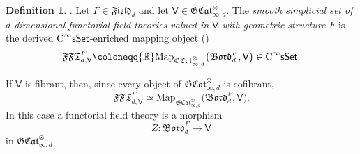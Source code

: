 \documentclass{amsart}
\newcommand{\cat}[1]{\mathsf{#1}}
\newcommand{\sset}{\cat{sSet}}
\newcommand{\CsSet}{\textnormal{C}^{\infty}\sset}
\newcommand{\field}[1]{\mathfrak{Field}_{#1}}
\newcommand{\Bord}{\mathfrak{Bord}}
\newcommand{\FFT}{\mathfrak{FFT}}
\newcommand{\GCat}{\mathfrak{G}\mathfrak{Cat}}
\newcommand{\Map}{\mathrm{Map}}
\newcommand{\RR}{{\mathbb{R}}}
\theoremstyle{definition}
\newtheorem{definition}[equation]{Definition}
\numberwithin{equation}{subsection}
\numberwithin{subsubsection}{subsection}
\begin{document}
\begin{definition}\label{def:functorial.field.theory}
  \textnormal{\cite[Definition~5.3.18]{GP26}.}
  Let \(F\in\field{d}\) and let
  \(\cat{V}\in\GCat_{\infty,d}^{\otimes}\).
  The \emph{smooth simplicial set of \(d\)-dimensional functorial
    field theories valued in \(\cat{V}\) with geometric structure
  \(F\)} is the derived \(\CsSet\)-enriched mapping object
  ()
  \begin{equation}\label{eq:fft.object}
    \FFT_{d,\cat{V}}^{F}
    \coloneqq
    \RR\Map_{\GCat_{\infty,d}^{\otimes}}
    \bigl(\Bord_{d}^{F},\cat{V}\bigr)
    \in\CsSet.
  \end{equation}

  If \(\cat{V}\) is fibrant, then, since every object of
  \(\GCat_{\infty,d}^{\otimes}\) is cofibrant,
  \[
    \FFT_{d,\cat{V}}^{F}
    \simeq
    \Map_{\GCat_{\infty,d}^{\otimes}}
    \bigl(\Bord_{d}^{F},\cat{V}\bigr).
  \]
  In this case a functorial field theory is a morphism
  \[
    Z:\Bord_{d}^{F}\longrightarrow\cat{V}
  \]
  in \(\GCat_{\infty,d}^{\otimes}\).
\end{definition}
\end{document}
